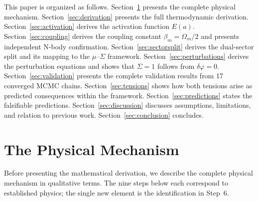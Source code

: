 \documentclass[twocolumn,a4paper,aps,prd,twocolumn,showpacs,notitlepage,superscriptaddress,nofootinbib]{article}
\newcommand{\Ea}{E(a)}
\newcommand{\betam}{\beta_{m}}
\begin{document}
This paper is organized as follows.  Section~\ref{sec:mechanism} presents the
complete physical mechanism.  Section~\ref{sec:derivation} presents the full
thermodynamic derivation.  Section~\ref{sec:activation} derives the activation
function $\Ea$.  Section~\ref{sec:coupling} derives the coupling constant
$\betam = \Omega_m/2$ and presents independent N-body confirmation.
Section~\ref{sec:sectorsplit} derives the dual-sector split and its mapping
to the $\mu$--$\Sigma$ framework.  Section~\ref{sec:perturbations} derives
the perturbation equations and shows that $\Sigma = 1$ follows from
$\delta\varphi = 0$.  Section~\ref{sec:validation} presents the complete
validation results from 17 converged MCMC chains.  Section~\ref{sec:tensions}
shows how both tensions arise as predicted consequences within the framework.  Section~\ref{sec:predictions}
states the falsifiable predictions.  Section~\ref{sec:discussion} discusses
assumptions, limitations, and relation to previous work.
Section~\ref{sec:conclusion} concludes.

\section{The Physical Mechanism}
\label{sec:mechanism}

Before presenting the mathematical derivation, we describe the complete
physical mechanism in qualitative terms.  The nine steps below each correspond
to established physics; the single new element is the identification in
Step~6.
\end{document}
